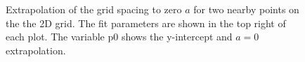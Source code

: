 \documentclass[singlepage,notitlepage,nofootinbib,11pt]{revtex4-1}
\begin{document}
\begin{figure}[h]
  \centering
  \captionsetup[subfigure]{labelformat=empty}
  \caption{\label{extrapolation} Extrapolation of the grid spacing to zero $a$ for two nearby points on the the 2D grid. The fit parameters are shown in the top right of each plot. The variable p0 shows the y-intercept and $a=0$ extrapolation.}
\end{figure}
\end{document}
